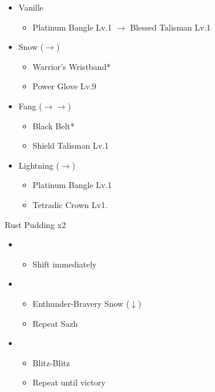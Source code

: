 \begin{menu}
	\begin{itemize}
		\equip
		\begin{itemize}
			\item Vanille
				\begin{itemize}
					\item Platinum Bangle Lv.1 $\rightarrow$ Blessed Talisman Lv.1
				\end{itemize}
			\item Snow ($\rightarrow$)
				\begin{itemize}
					\item Warrior's Wristband*
					\item Power Glove Lv.9
				\end{itemize}
			\item Fang ($\rightarrow\rightarrow$)
				\begin{itemize}
					\item Black Belt*
					\item Shield Talisman Lv.1
				\end{itemize}
			\item Lightning ($\rightarrow$)
				\begin{itemize}
					\item Platinum Bangle Lv.1
					\item Tetradic Crown Lv1.
				\end{itemize}
		\end{itemize}
	\end{itemize}
\end{menu}

\begin{battle}{Rust Pudding x2}
	\begin{itemize}
		\item \fourth
			\begin{itemize}
				\item Shift immediately
			\end{itemize}
		\item \third
			\begin{itemize}
				\item Enthunder-Bravery Snow ($\downarrow$)
				\item Repeat Sazh
			\end{itemize}
		\item \fourth
			\begin{itemize}
				\item Blitz-Blitz
				\item Repeat until victory
			\end{itemize}
	\end{itemize}
\end{battle}


